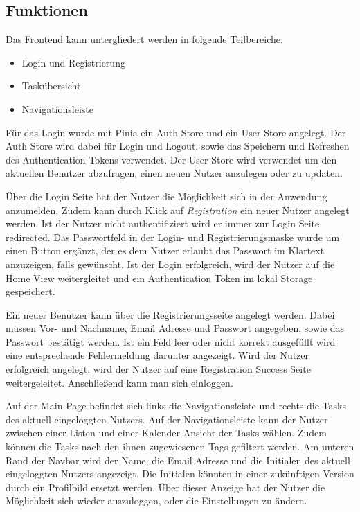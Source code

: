 \documentclass[a4paper, 12pt]{article}
\begin{document}
    \subsection{Funktionen}
    Das Frontend kann untergliedert werden in folgende Teilbereiche:

    \begin{itemize}
        \item Login und Registrierung
        \item Taskübersicht
        \item Navigationsleiste
    \end{itemize}

    Für das Login wurde mit Pinia ein Auth Store und ein User Store angelegt. Der Auth Store wird dabei für Login und
    Logout, sowie das Speichern und Refreshen des Authentication Tokens verwendet. Der User Store wird verwendet um den
    aktuellen Benutzer abzufragen, einen neuen Nutzer anzulegen oder zu updaten.
    
    Über die Login Seite hat der Nutzer die Möglichkeit sich in der Anwendung anzumelden. Zudem kann durch Klick auf
    {\it Registration} ein neuer Nutzer angelegt werden. Ist der Nutzer nicht authentifiziert wird er immer zur Login
    Seite redirected. Das Passwortfeld in der Login- und Registrierungsmaske wurde um einen Button ergänzt, der es dem
    Nutzer erlaubt das Passwort im Klartext anzuzeigen, falls gewünscht. Ist der Login erfolgreich, wird der Nutzer auf
    die Home View weitergleitet und ein Authentication Token im lokal Storage gespeichert.

    Ein neuer Benutzer kann über die Registrierungsseite angelegt werden. Dabei müssen Vor- und Nachname, Email Adresse
    und Passwort angegeben, sowie das Passwort bestätigt werden. Ist ein Feld leer oder nicht korrekt ausgefüllt wird
    eine entsprechende Fehlermeldung darunter angezeigt. Wird der Nutzer erfolgreich angelegt, wird der Nutzer auf eine
    Registration Success Seite weitergeleitet. Anschließend kann man sich einloggen.

    Auf der Main Page befindet sich links die Navigationsleiste und rechts die Tasks des aktuell eingeloggten Nutzers.
    Auf der Navigationsleiste kann der Nutzer zwischen einer Listen und einer Kalender Ansicht der Tasks wählen. Zudem
    können die Tasks nach den ihnen zugewiesenen Tags gefiltert werden. Am unteren Rand der Navbar wird der Name, die
    Email Adresse und die Initialen des aktuell eingeloggten Nutzers angezeigt. Die Initialen könnten in einer
    zukünftigen Version durch ein Profilbild ersetzt werden. Über dieser Anzeige hat der Nutzer die Möglichkeit sich
    wieder auszuloggen, oder die Einstellungen zu ändern.
\end{document}
